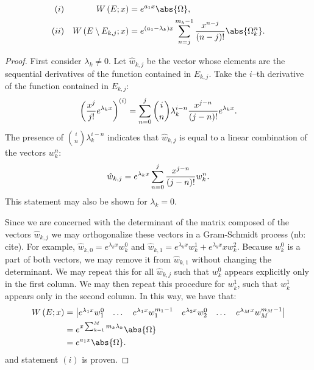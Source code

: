 \documentclass{article}
\begin{document}
\begin{thm} \label{thm:cc}
\begin{align*}
(i) && \W{E}{x} & = e^{a_1 x} \abs{\Omega}, \\
(ii) && \W{E \setminus E_{k,j}}{x} & = e^{(a_1 - \lambda_k) x} \sum_{n=j}^{m_k - 1} \poly{n-j} \abs{\Omega_k^n} .
\end{align*}
\end{thm}

\begin{proof}
First consider $\lambda_k \neq 0$.
Let $\hat{w}_{k,j}$ be the vector whose elements are the sequential derivatives of the function contained in $E_{k,j}$.
Take the $i$--th derivative of the function contained in $E_{k,j}$:
\begin{equation*}
\left ( \frac{x^j}{j!} e^{\lambda_k x} \right )^{(i)} = \sum_{n=0}^j \binom{i}{n} \lambda_k^{i-n} \frac{x^{j-n}}{(j-n)!} e^{\lambda_k x} .
\end{equation*}
The presence of $\binom{i}{n} \lambda_k^{i-n}$ indicates that $\hat{w}_{k,j}$ is equal to a linear combination of the vectors $w_k^n$:
\begin{equation*}
\hat{w}_{k,j} = e^{\lambda_k x} \sum_{n=0}^j \frac{x^{j-n}}{(j-n)!} w_k^n .
\end{equation*}
This statement may also be shown for $\lambda_k = 0$.

Since we are concerned with the determinant of the matrix composed of the vectors $\hat{w}_{k,j}$ we may orthogonalize these vectors in a Gram-Schmidt process (nb: cite).
For example, $\hat{w}_{k,0} = e^{\lambda_k x} w_k^0$ and $\hat{w}_{k,1} = e^{\lambda_k x} w_k^1 + e^{\lambda_k x} x w_k^2$.
Because $w_k^0$ is a part of both vectors, we may remove it from $\hat{w}_{k,1}$ without changing the determinant.
We may repeat this for all $\hat{w}_{k,j}$ such that $w_k^0$ appears explicitly only in the first column.
We may then repeat this procedure for $w_k^1$, such that $w_k^1$ appears only in the second column.
In this way, we have that:
\begin{equation*}
\begin{split}
\W{E}{x} & = \begin{vmatrix} e^{\lambda_1 x} w_1^0 & \dots & e^{\lambda_1 x} w_1^{m_1-1} & e^{\lambda_2 x} w_2^0 & \dots & e^{\lambda_M x} w_M^{m_M-1} \end{vmatrix} \\
		 & = e^{x \sum_{k=1}^M m_k \lambda_k} \abs{\Omega} \\
		 & = e^{a_1 x} \abs{\Omega}.
\end{split}
\end{equation*}
and statement $(i)$ is proven.


\end{proof}
\end{document}
